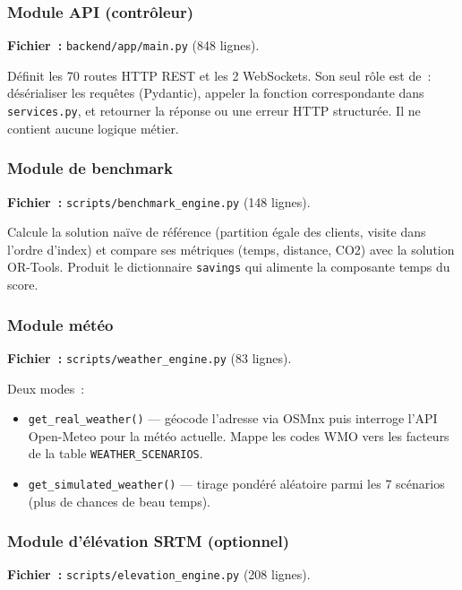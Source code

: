 \documentclass[a4paper, 12pt, twoside]{article}
\begin{document}
\subsubsection{Module API (contr\^{o}leur)}

\textbf{Fichier~:} \texttt{backend/app/main.py} (848 lignes).

D\'{e}finit les 70 routes HTTP REST et les 2 WebSockets. Son seul r\^{o}le est de~:
d\'{e}s\'{e}rialiser les requ\^{e}tes (Pydantic), appeler la fonction correspondante dans
\texttt{services.py}, et retourner la r\'{e}ponse ou une erreur HTTP structur\'{e}e.
Il ne contient aucune logique m\'{e}tier.

\subsubsection{Module de benchmark}

\textbf{Fichier~:} \texttt{scripts/benchmark\_engine.py} (148 lignes).

Calcule la solution na\"ive de r\'{e}f\'{e}rence (partition \'{e}gale des clients, visite
dans l'ordre d'index) et compare ses m\'{e}triques (temps, distance, CO2) avec la solution
OR-Tools. Produit le dictionnaire \texttt{savings} qui alimente la composante temps du score.

\subsubsection{Module m\'{e}t\'{e}o}

\textbf{Fichier~:} \texttt{scripts/weather\_engine.py} (83 lignes).

Deux modes~:
\begin{itemize}
  \item \texttt{get\_real\_weather()} --- g\'{e}ocode l'adresse via OSMnx puis interroge l'API Open-Meteo pour la m\'{e}t\'{e}o actuelle. Mappe les codes WMO vers les facteurs de la table \texttt{WEATHER\_SCENARIOS}.
  \item \texttt{get\_simulated\_weather()} --- tirage pond\'{e}r\'{e} al\'{e}atoire parmi les 7 sc\'{e}narios (plus de chances de beau temps).
\end{itemize}

\subsubsection{Module d'\'{e}l\'{e}vation SRTM (optionnel)}

\textbf{Fichier~:} \texttt{scripts/elevation\_engine.py} (208 lignes).
\end{document}
